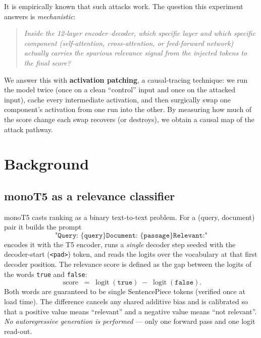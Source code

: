 \documentclass[11pt]{article}
\newcommand{\score}{\operatorname{score}}
\begin{document}
It is empirically known that such attacks work. The question this experiment
answers is \emph{mechanistic}:

\begin{quote}
\itshape Inside the 12-layer encoder--decoder, which specific layer and which
specific component (self-attention, cross-attention, or feed-forward network)
actually carries the spurious relevance signal from the injected tokens to the
final score?
\end{quote}

We answer this with \textbf{activation patching}, a causal-tracing technique:
we run the model twice (once on a clean ``control'' input and once on the
attacked input), cache every intermediate activation, and then surgically swap
one component's activation from one run into the other. By measuring how much
of the score change each swap recovers (or destroys), we obtain a causal map of
the attack pathway.

\section{Background}

\subsection{monoT5 as a relevance classifier}

monoT5 casts ranking as a binary text-to-text problem. For a (query, document)
pair it builds the prompt
\[
\texttt{"Query: \{query\} Document: \{passage\} Relevant:"}
\]
encodes it with the T5 encoder, runs a \emph{single} decoder step seeded with the
decoder-start (\texttt{<pad>}) token, and reads the logits over the vocabulary at
that first decoder position. The relevance score is defined as the gap between
the logits of the words \texttt{true} and \texttt{false}:
\begin{equation}
\score \;=\; \operatorname{logit}(\texttt{true}) \;-\; \operatorname{logit}(\texttt{false}).
\label{eq:score}
\end{equation}
Both words are guaranteed to be single SentencePiece tokens (verified once at
load time). The difference cancels any shared additive bias and is calibrated so
that a positive value means ``relevant'' and a negative value means ``not
relevant''. \emph{No autoregressive generation is performed} — only one forward
pass and one logit read-out.
\end{document}
